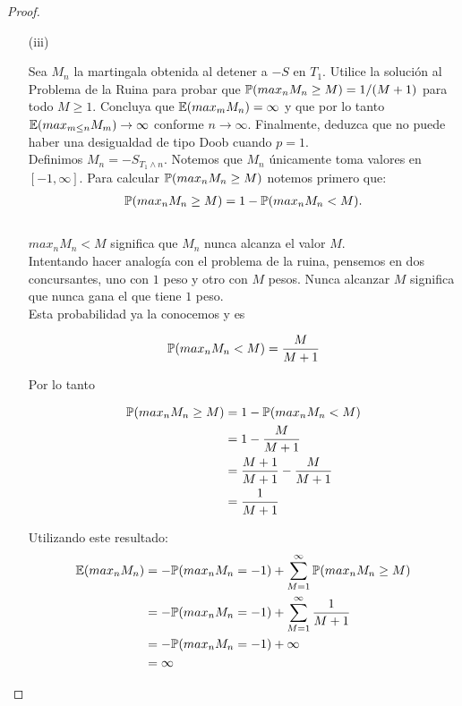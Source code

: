 \begin{proof}
\begin{enumerate}
		\item[(iii)] 
		
		Sea $M_n$ la martingala obtenida al detener a $-S$ en $T_1$. Utilice la solución al
		Problema de la Ruina para probar que $\mathbb{P}(max_n M_n \geq M) = 1/(M+1)$ para todo $M \geq 1$. Concluya que
		$\mathbb{E}(max_m M_n) = \infty$ y que por lo tanto $\mathbb{E}(max_{m\leq n} M_m) \rightarrow \infty$ conforme 
		$n \rightarrow \infty$. Finalmente, deduzca que no puede haber una desigualdad de tipo Doob cuando $p=1$.\\
		
			Definimos $M_n = -S_{T_1 \wedge n}$. Notemos que $M_n$ únicamente toma valores en $[-1, \infty]$.
			Para calcular $\mathbb{P}(max_n M_n \geq M)$ notemos primero que:
			\begin{align}
				\mathbb{P}(max_n M_n \geq M) = 1 - \mathbb{P}(max_n M_n < M).
			\end{align}\\
			
			$max_n M_n < M$ significa que $M_n$ nunca alcanza el valor $M$.\\
			 
			Intentando hacer analogía con el problema de la ruina, pensemos en dos concursantes,
			uno con $1$ peso y otro con $M$ pesos. Nunca alcanzar $M$ significa que nunca gana el que tiene $1$ peso.\\
			
			Esta probabilidad ya la conocemos y es 
			
			\begin{align*}
				\mathbb{P}(max_n M_n < M) = \frac{M}{M + 1}
			\end{align*}
				
			Por lo tanto
			
			\begin{align}
				\mathbb{P}(max_n M_n \geq M) 	&= 1 - \mathbb{P}(max_n M_n < M) \\
										&= 1 - \frac{M}{M + 1}\\
										&= \frac{M+1}{M+1} - \frac{M}{M + 1}\\
										&= \frac{1}{M+1}
			\end{align}
			
			Utilizando este resultado:
			\begin{align} \label{problema1_3:esperanza_del_maximo_de_M_n}
				\mathbb{E}(max_n M_n) 	&= - \mathbb{P}(max_n M_n = -1) + \sum_{M=1}^{\infty} \mathbb{P}(max_n M_n \geq M) \\
								&= - \mathbb{P}(max_n M_n = -1) + \sum_{M=1}^{\infty} \frac{1}{M+1} \\ 
								&= - \mathbb{P}(max_n M_n = -1) + \infty \\
								&= \infty
			\end{align}						
			

\end{enumerate}
\end{proof}
